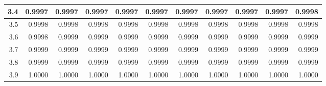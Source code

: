 \documentclass[10pt]{article}
\begin{document}
\begin{center}
\begin{tabular}{|r|r@{\ }r@{\ }r@{\ }r@{\ }r@{\ }r@{\ }r@{\ }r@{\ }r@{\ }r@{\ }|}
    \hline
    3.4&0.9997&0.9997&0.9997&0.9997&0.9997&0.9997&0.9997&0.9997&0.9997&0.9998\\
    \hline
    3.5&0.9998&0.9998&0.9998&0.9998&0.9998&0.9998&0.9998&0.9998&0.9998&0.9998\\
    \hline
    3.6&0.9998&0.9999&0.9999&0.9999&0.9999&0.9999&0.9999&0.9999&0.9999&0.9999\\
    \hline
    3.7&0.9999&0.9999&0.9999&0.9999&0.9999&0.9999&0.9999&0.9999&0.9999&0.9999\\
    \hline
    3.8&0.9999&0.9999&0.9999&0.9999&0.9999&0.9999&0.9999&0.9999&0.9999&0.9999\\
    \hline
    3.9&1.0000&1.0000&1.0000&1.0000&1.0000&1.0000&1.0000&1.0000&1.0000&1.0000\\
    \hline
    \end{tabular}
    \end{center}
    
\end{document}
